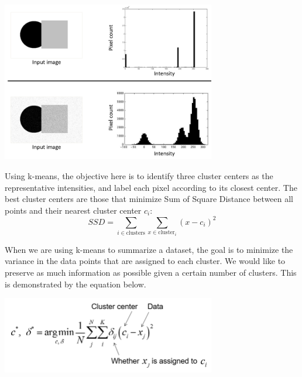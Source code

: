 \documentclass{article}
\begin{document}
\begin{minipage}{\linewidth}
\begin{center}
\includegraphics[width=0.70\textwidth]{k-means-example.png}
\end{center}
\end{minipage}

Using k-means, the objective here is to identify three cluster centers as the representative intensities, and label each pixel according to its closest center. The best cluster centers are those that minimize Sum of Square Distance between all points and their nearest cluster center $c_i$:
\begin{equation}
SSD = \sum_{i \in \textrm{clusters}}\sum_{x \in \textrm{cluster}_i}(x-c_i)^2
\end{equation}

When we are using k-means to summarize a dataset, the goal is to minimize the variance in the data points that are assigned to each cluster. We would like to preserve as much information as possible given a certain number of clusters. This is demonstrated by the equation below.
\begin{minipage}{\linewidth}
\begin{center}
\includegraphics[width=0.70\textwidth]{clustering_for_summarization.png}
\end{center}
\end{minipage}
\end{document}
